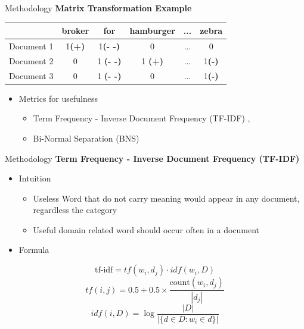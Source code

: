 \begin{frame}[label=metho]{Methodology}
	\textbf{Matrix Transformation Example}
	
	
	\begin{table}[H]
		\centering
		\begin{tabular}{|c|c|c|c|c|c|}
			\hline 
			&  broker  & for & hamburger & ... & zebra   \\ 
			\hline 
			Document 1 &    1\textbf{(+)} & 1\textbf{(- -)} & 0 & ... & 0  \\ 
			\hline 
			Document 2&    0 &  1 \textbf{(- -)}& 1 \textbf{(+)} & ... & 1\textbf{(-)} \\ 
			\hline 
			Document 3 &    0 & 1 \textbf{(- -)} & 0 & ... & 1\textbf{(-)}  \\ 
			\hline 
			
		\end{tabular} 
		
	\end{table}
	
\begin{itemize}
	\item Metrics for usefulness
	\begin{itemize}
		\item Term Frequency - Inverse Document Frequency (TF-IDF) \cite{Francis2006}, \cite{jurafsky2009speech}
		\item Bi-Normal Separation (BNS)
	\end{itemize}
\end{itemize}

\end{frame}

\begin{frame}[label=metho]{Methodology}
	\textbf{Term Frequency - Inverse Document Frequency (TF-IDF)}
	\begin{itemize}
		\item Intuition
		\begin{itemize}
			\item Useless Word that do not carry meaning would appear in any document, regardless the category
			\item Useful domain related word should occur often in a document
		\end{itemize}
		\item Formula
\end{itemize}
$$ \textrm{tf-idf} = tf(w_i,d_j) \cdot idf(w_i, D)$$
$$tf(i, j) = 0.5 + 0.5 \times \frac{\textrm{count}(w_i, d_j)}{|d_j|}  $$
$$idf(i, D) = \log \frac{|D|}{|\{d \in D :  w_i \in d \}|}$$

\end{frame}


